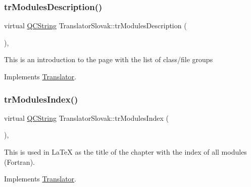 \mbox{\label{class_translator_slovak_a8e229f61e9daeb500001f380f04e5d93}} 
\subsubsection{\texorpdfstring{trModulesDescription()}{trModulesDescription()}}
{\footnotesize\ttfamily virtual \mbox{\hyperlink{class_q_c_string}{Q\+C\+String}} Translator\+Slovak\+::tr\+Modules\+Description (\begin{DoxyParamCaption}{ }\end{DoxyParamCaption})\hspace{0.3cm}{\ttfamily [inline]}, {\ttfamily [virtual]}}

This is an introduction to the page with the list of class/file groups 

Implements \mbox{\hyperlink{class_translator}{Translator}}.

\mbox{\label{class_translator_slovak_ae3097da76dda89e7dccac87f29d13827}} 
\subsubsection{\texorpdfstring{trModulesIndex()}{trModulesIndex()}}
{\footnotesize\ttfamily virtual \mbox{\hyperlink{class_q_c_string}{Q\+C\+String}} Translator\+Slovak\+::tr\+Modules\+Index (\begin{DoxyParamCaption}{ }\end{DoxyParamCaption})\hspace{0.3cm}{\ttfamily [inline]}, {\ttfamily [virtual]}}

This is used in La\+TeX as the title of the chapter with the index of all modules (Fortran). 

Implements \mbox{\hyperlink{class_translator}{Translator}}.

\mbox{\label{class_translator_slovak_a91faa4ab97831c46b89f56a39908d9fb}} 
